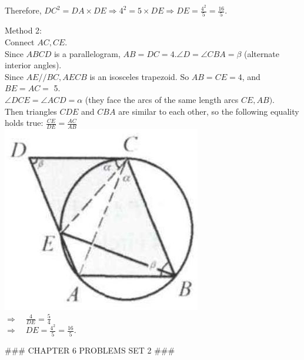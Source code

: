 \documentclass[10pt]{article}
\begin{document}
Therefore, \(D C^{2}=D A \times D E \Rightarrow 4^{2}=5 \times D E \Rightarrow D E=\frac{4^{2}}{5}=\frac{16}{5}\).

Method 2:\\
Connect \(A C, C E\).\\
Since \(A B C D\) is a parallelogram, \(A B=D C=4 . \angle D=\angle C B A=\beta\) (alternate interior angles).\\
Since \(A E / / B C, A E C B\) is an isosceles trapezoid. So \(A B=C E=4\), and \(B E=A C=\) 5.\\
\(\angle D C E=\angle A C D=\alpha\) (they face the arcs of the same length arcs \(C E, A B)\).\\
Then triangles \(C D E\) and \(C B A\) are similar to each other, so the following equality holds true: \(\frac{C E}{D E}=\frac{A C}{A B}\)\\
\includegraphics[max width=\textwidth, center]{2025_04_17_97bc1f7e44d93c271a88g-168}\\
\(\Rightarrow \quad \frac{4}{D E}=\frac{5}{4}\)\\
\(\Rightarrow \quad D E=\frac{4^{2}}{5}=\frac{16}{5}\).


### CHAPTER 6 PROBLEMS SET 2 ###
\end{document}
